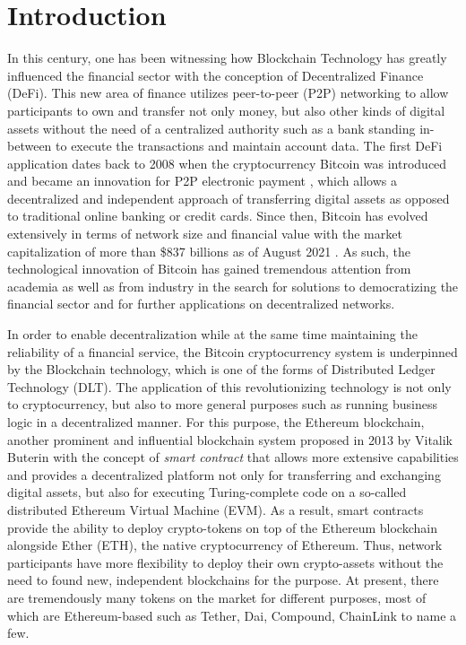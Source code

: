
\chapter{Introduction}\label{chapter:introduction}
In this century, one has been witnessing how Blockchain Technology has greatly influenced the financial sector with the conception of Decentralized Finance (DeFi). This new area of finance utilizes peer-to-peer (P2P) networking to allow participants to own and transfer not only money, but also other kinds of digital assets without the need of a centralized authority such as a bank standing in-between to execute the transactions and maintain account data.
The first DeFi application dates back to 2008 when the cryptocurrency Bitcoin was introduced and became an innovation for P2P electronic payment \cite{satoshi2008peer}, which allows a decentralized and independent approach of transferring digital assets as opposed to traditional online banking or credit cards. Since then, Bitcoin has evolved extensively in terms of network size and financial value with the market capitalization of more than \$837 billions as of August 2021 \cite{bitinfocharts}. As such, the technological innovation of Bitcoin has gained tremendous attention from academia as well as from industry in the search for solutions to democratizing the financial sector and for further applications on decentralized networks.

In order to enable decentralization while at the same time maintaining the reliability of a financial service, the Bitcoin cryptocurrency system is underpinned by the Blockchain technology, which is one of the forms of Distributed Ledger Technology (DLT). The application of this revolutionizing technology is not only to cryptocurrency, but also to more general purposes such as running business logic in a decentralized manner. For this purpose, the Ethereum blockchain, another prominent and influential blockchain system proposed in 2013 by Vitalik Buterin \cite{buterin2014next} with the concept of \textit{smart contract} that allows more extensive capabilities and provides a decentralized platform not only for transferring and exchanging digital assets, but also for executing Turing-complete code on a so-called distributed Ethereum Virtual Machine (EVM). As a result, smart contracts provide the ability to deploy crypto-tokens on top of the Ethereum blockchain alongside Ether (ETH), the native cryptocurrency of Ethereum. Thus, network participants have more flexibility to deploy their own crypto-assets without the need to found new, independent blockchains for the purpose. At present, there are tremendously many tokens on the market for different purposes, most of which are Ethereum-based such as Tether, Dai, Compound, ChainLink to name a few.

